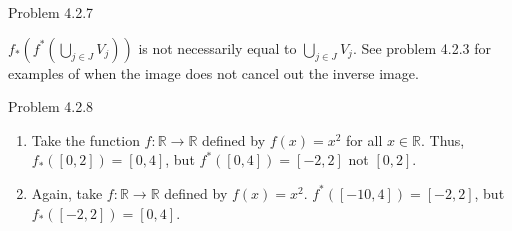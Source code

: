 \documentclass{article}
\theoremstyle{definition}
\newcommand{\R}{\mathbb{R}}
\begin{document}
	\vspace{1cm}




	\noindent Problem 4.2.7  \vspace{0.3cm}

	$f_*(f^*(\bigcup_{j\in J}V_j))$ is not necessarily equal to
	$\bigcup_{j\in J}V_j$. See problem 4.2.3 for examples of when the
	image does not cancel out the inverse image.

	\vspace{1cm}



	\noindent Problem 4.2.8  \vspace{0.3cm}

	\begin{enumerate}
		\item  Take the function $f:\R\rightarrow\R$ defined by $f(x)=x^2$
		for all $x\in\R$. Thus, $f_*([0,2])=[0,4]$, but $f^*([0,4])=[-2,2]$
		not $[0,2]$.
		\item Again, take $f:\R\rightarrow\R$ defined by $f(x)=x^2$.
		$f^*([-10,4])=[-2,2]$, but $f_*([-2,2])=[0,4]$.
	\end{enumerate}

	\vspace{1cm}



\end{document}
